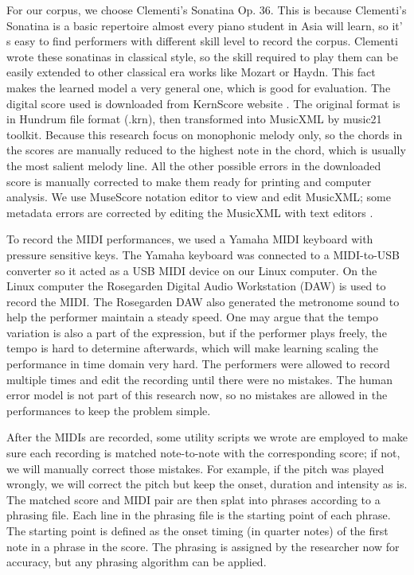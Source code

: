 For our corpus, we choose Clementi's Sonatina Op. 36.  This is because  Clementi's Sonatina is a basic repertoire almost every piano student in Asia will learn, so it' s easy to find performers with different skill level to record the corpus. Clementi wrote these sonatinas in classical style, so the skill required to play them can be easily extended to other classical era works like Mozart or Haydn. This fact makes the learned model a very general one, which is good for evaluation.
The digital score used is downloaded from KernScore website \cite{KernScores}. The original format is in Hundrum file format (.krn), then transformed into MusicXML by music21 toolkit. Because this research focus on monophonic melody only, so the chords in the scores are manually reduced to the highest note in the chord, which is usually the most salient melody line. All the other possible errors in the downloaded score is manually corrected to make them ready for printing and computer analysis. We use MuseScore notation editor to view and edit MusicXML; some metadata errors are corrected by editing the MusicXML with text editors .

To record the MIDI performances, we used a Yamaha MIDI keyboard with pressure sensitive keys. The Yamaha keyboard was connected to a MIDI-to-USB  converter so it acted as a USB MIDI device on our Linux computer. On the Linux computer the Rosegarden Digital Audio Workstation (DAW) is used to record the MIDI. The Rosegarden DAW also generated the metronome sound to help the performer maintain a steady speed. One may argue that the tempo variation is also a part of the expression, but if the performer plays freely, the tempo is hard to determine afterwards, which will make learning scaling the performance in time domain very hard.  The performers were allowed to record multiple times and edit the recording until there were no mistakes. The human error model is not part of this research now, so no mistakes are allowed in the performances to keep the problem simple.

  After the MIDIs are recorded, some utility scripts we wrote are employed to  make sure each recording is matched note-to-note with the corresponding score; if not, we will manually correct those mistakes. For example, if the pitch was played wrongly, we will correct the pitch but keep the onset, duration  and intensity as is. The matched score and MIDI pair are then splat into phrases according to a phrasing file.  Each line in the phrasing file is the starting point of each phrase. The starting point is defined as the onset timing (in quarter notes) of the first note in a phrase in the score.  The phrasing is assigned by the researcher now for accuracy, but any phrasing algorithm can be applied.


